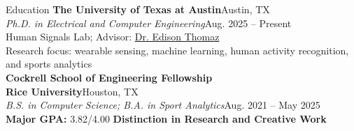 \documentclass{resume}
\begin{document}
\begin{rSection}{Education}
\textbf{The University of Texas at Austin}\hfill Austin, TX\\
\textit{Ph.D. in Electrical and Computer Engineering}\hfill Aug. 2025 -- Present\\
Human Signals Lab; Advisor: \href{https://users.ece.utexas.edu/~ethomaz/}{Dr. Edison Thomaz}\\
Research focus: wearable sensing, machine learning, human activity recognition, and sports analytics\\
\textbf{Cockrell School of Engineering Fellowship}\\[2pt]
\textbf{Rice University}\hfill Houston, TX\\
\textit{B.S. in Computer Science; B.A. in Sport Analytics}\hfill Aug. 2021 -- May 2025\\
\textbf{Major GPA:} 3.82/4.00 \quad \textbf{Distinction in Research and Creative Work}
\end{rSection}
\end{document}
